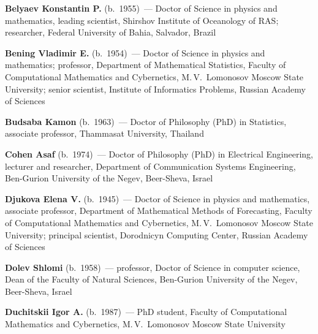 \begin{multicols}{2}



\noindent
\textbf{Belyaev Konstantin P.} (b.\ 1955)~--- 
Doctor of Science in physics and mathematics, 
leading scientist, Shirshov Institute of Oceanology of RAS; 
researcher, Federal University of Bahia, Salvador, Brazil

\vspace*{4pt}

\noindent
\textbf{Bening Vladimir E.} (b.\ 1954)~--- Doctor of Science in physics 
and mathematics; professor, Department of Mathematical Statistics, 
Faculty of Computational Mathematics and Cybernetics, 
M.\,V.~Lomonosov Moscow State University; senior scientist, 
Institute of Informatics Problems, Russian Academy of Sciences

\vspace*{4pt}

\noindent
\textbf{Budsaba Kamon} (b.\ 1963)~--- Doctor of Philosophy (PhD)
in Statistics, associate professor, Thammasat University, Thailand

\vspace*{4pt}

\noindent
\textbf{Cohen Asaf} (b.\ 1974)~--- Doctor of Philosophy (PhD) 
in Electrical Engineering, lecturer and researcher,
Department of Communication Systems Engineering,
Ben-Gurion University of the Negev, Beer-Sheva, Israel



\vspace*{4pt}

\noindent
\textbf{Djukova Elena V.} (b.\ 1945)~--- 
Doctor of Science in physics and mathematics, associate professor,
Department of Mathematical Methods of Forecasting,
Faculty of Computational Mathematics and Cybernetics, 
M.\,V.~Lomonosov Moscow State University; principal scientist, 
Dorodnicyn Computing Center, Russian Academy of Sciences  

\vspace*{4pt}

\noindent
\textbf{Dolev Shlomi} (b.\ 1958)~--- professor, Doctor of Science in computer science,
Dean of the Faculty of Natural Sciences, Ben-Gurion University of the Negev, Beer-Sheva, Israel

\vspace*{4pt}

\noindent 
\textbf{Duchitskii Igor A.} (b.\ 1987)~--- PhD student, Faculty of Computational
Mathematics and Cybernetics, M.\,V.~Lomonosov Moscow State University


\end{multicols}
